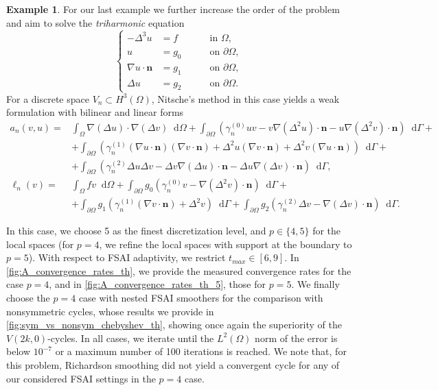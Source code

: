 \documentclass[a4paper]{article}
\newcommand{\diff}{\mathop{}\!\mathrm{d}}
\theoremstyle{plain}
\theoremstyle{definition}
\newtheorem{example}{Example}[section]
\theoremstyle{remark}
\begin{document}
\begin{example}\label{ex:triharmonic_square}
	For our last example we further increase the order of the problem and aim to solve the \emph{triharmonic} equation
	\begin{equation*}
		\left\{
		\begin{aligned}
			-\Delta^3 u &= f \quad &&\text{ in } \Omega,\\
			u &= g_0 \quad &&\text{ on } \partial\Omega,\\
			\nabla u \cdot \mathbf{n} &= g_1 \quad &&\text{ on } \partial\Omega,\\
			\Delta u &= g_2 \quad &&\text{ on } \partial\Omega.
		\end{aligned}
		\right.
	\end{equation*}
	For a discrete space \(V_n\subset H^3(\Omega)\), Nitsche's method in this case yields a weak formulation with bilinear and linear forms
	\begin{align*}
		a_n(v, u) =& \int_{\Omega} \nabla (\Delta u) \cdot \nabla (\Delta v) \diff\Omega + \int_{\partial\Omega} \left(\gamma_n^{(0)} u v - v \nabla(\Delta^2 u) \cdot \mathbf{n} - u \nabla(\Delta^2 v) \cdot \mathbf{n} \right) \diff\Gamma +\\
		&+ \int_{\partial\Omega} \left( \gamma_n^{(1)} (\nabla u \cdot \mathbf{n}) (\nabla v \cdot \mathbf{n}) + \Delta^2 u (\nabla v \cdot \mathbf{n}) + \Delta^2 v (\nabla u \cdot \mathbf{n}) \right) \diff\Gamma +\\
		&+ \int_{\partial\Omega} \left( \gamma_n^{(2)} \Delta u \Delta v - \Delta v \nabla (\Delta u) \cdot \mathbf{n} - \Delta u \nabla (\Delta v) \cdot \mathbf{n} \right) \diff\Gamma ,\\
		\ell_n(v) =& \int_{\Omega} f v \diff\Omega + \int_{\partial\Omega} g_0 \left(\gamma_n^{(0)} v - \nabla(\Delta^2 v) \cdot \mathbf{n} \right) \diff\Gamma +\\
		&+ \int_{\partial\Omega} g_1 \left( \gamma_n^{(1)} (\nabla v \cdot \mathbf{n}) + \Delta^2 v \right) \diff\Gamma + \int_{\partial\Omega} g_2 \left( \gamma_n^{(2)} \Delta v - \nabla (\Delta v) \cdot \mathbf{n} \right) \diff\Gamma.
	\end{align*}
	
	In this case, we choose 5 as the finest discretization level, and \(p\in\{4,5\}\) for the local spaces (for \(p=4\), we refine the local spaces with support at the boundary to \(p=5\)). With respect to FSAI adaptivity, we restrict \(t_{max} \in [6, 9]\). In \cref{fig:A_convergence_rates_th}, we provide the measured convergence rates for the case \(p = 4\), and in \cref{fig:A_convergence_rates_th_5}, those for \(p = 5\). We finally choose the \(p = 4\) case with nested FSAI smoothers for the comparison with nonsymmetric cycles, whose results we provide in \cref{fig:sym_vs_nonsym_chebyshev_th}, showing once again the superiority of the \(V(2k, 0)\)-cycles. In all cases, we iterate until the \(L^2(\Omega)\) norm of the error is below \(10^{-7}\) or a maximum number of 100 iterations is reached. We note that, for this problem, Richardson smoothing did not yield a convergent cycle for any of our considered FSAI settings in the \(p = 4\) case.
	

\end{example}
\end{document}
